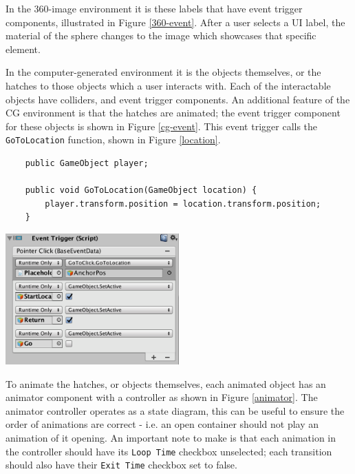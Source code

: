 \documentclass[ %
                    author={Elis Jones},
                supervisor={Dr. Kirsten Cater},
                    degree={BSc},
                     title={The Effect of Presentation Medium on Spatial Cognition},
                  subtitle={in the Virtual Environment},
                      year={2018} ]{dissertation}
\begin{document}
In the 360-image environment it is these labels that have event trigger components, illustrated in Figure \ref{360-event}. After a user selects a UI label, the material of the sphere changes to the image which showcases that specific element.

In the computer-generated environment it is the objects themselves, or the hatches to those objects which a user interacts with. Each of the interactable objects have colliders, and event trigger components. An additional feature of the CG environment is that the hatches are animated; the event trigger component for these objects is shown in Figure \ref{cg-event}. This event trigger calls the \lstinline{GoToLocation} function, shown in Figure \ref{location}. 

\begin{minipage}{\textwidth}
\centering
\begin{lstlisting}
	public GameObject player;

	public void GoToLocation(GameObject location) {
		player.transform.position = location.transform.position;
	}
\end{lstlisting}
\label{location}
\end{minipage}

\begin{minipage}{\textwidth}
    \centering
    \includegraphics[width=0.5\textwidth]{images/CG-event-component.png}
    \label{cg-event}
\end{minipage}


To animate the hatches, or objects themselves, each animated object has an animator component with a controller as shown in Figure \ref{animator}. The animator controller operates as a state diagram, this can be useful to ensure the order of animations are correct - i.e. an open container should not play an animation of it opening. An important note to make is that each animation in the controller should have its \lstinline{Loop Time} checkbox unselected; each transition should also have their \lstinline{Exit Time} checkbox set to false. 
\end{document}
